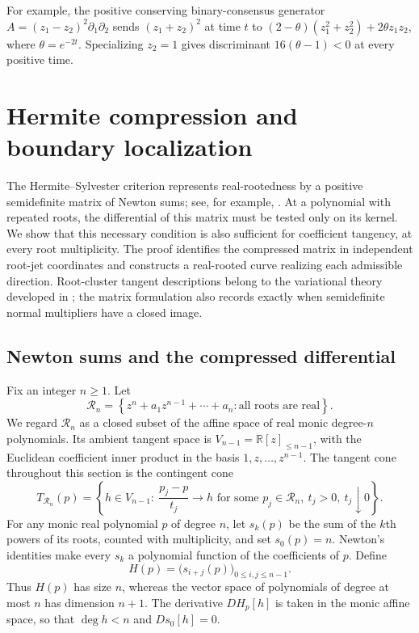 \documentclass[reqno]{amsart}
\theoremstyle{definition}
\theoremstyle{remark}
\newcommand{\R}{\mathbb R}
\begin{document}
For example, the positive conserving binary-consensus generator
\(A=(z_1-z_2)^2\partial_1\partial_2\) sends \((z_1+z_2)^2\) at time \(t\) to
\((2-\theta)(z_1^2+z_2^2)+2\theta z_1z_2\), where \(\theta=e^{-2t}\).
Specializing \(z_2=1\) gives discriminant \(16(\theta-1)<0\) at every
positive time.


\appendix
\section{Hermite compression and boundary localization}
\label{herm:section}

The Hermite--Sylvester criterion represents real-rootedness by a positive
semidefinite matrix of Newton sums; see, for example, \cite{Nathanson21}.
At a polynomial with repeated roots, the differential of this matrix must
be tested only on its kernel.  We show that this necessary condition is
also sufficient for coefficient tangency, at every root multiplicity.
The proof identifies the compressed matrix in independent root-jet
coordinates and constructs a real-rooted curve realizing each admissible
direction.  Root-cluster tangent descriptions belong to the variational
theory developed in \cite{BurkeOverton01,BurkeEaton12}; the matrix
formulation also records exactly when semidefinite normal multipliers
have a closed image.

\subsection{Newton sums and the compressed differential}

Fix an integer $n\geq1$.  Let
\[
 \mathcal R_n=
 \left\{z^n+a_1z^{n-1}+\cdots+a_n:
                  \text{all roots are real}\right\}.
\]
We regard $\mathcal R_n$ as a closed subset of the affine space of real
monic degree-$n$ polynomials.  Its ambient tangent space is
$V_{n-1}=\R[z]_{\leq n-1}$, with the Euclidean coefficient inner product
in the basis $1,z,\ldots,z^{n-1}$.  The tangent cone throughout this section
is the contingent cone
\begin{equation}
 T_{\mathcal R_n}(p)=
 \left\{h\in V_{n-1}:\ 
   \frac{p_j-p}{t_j}\longrightarrow h
   \text{ for some }p_j\in\mathcal R_n,
   \ t_j>0,\ t_j\downarrow0\right\}.
 \label{herm:tangent-definition}
\end{equation}
For any monic real polynomial $p$ of degree $n$, let $s_k(p)$ be the sum
of the $k$th powers of its roots, counted with multiplicity, and set
$s_0(p)=n$.  Newton's identities make every $s_k$ a polynomial function
of the coefficients of $p$.  Define
\begin{equation}
 H(p)=\bigl(s_{i+j}(p)\bigr)_{0\leq i,j\leq n-1}.
 \label{herm:matrix}
\end{equation}
Thus $H(p)$ has size $n$, whereas the vector space of polynomials of
degree at most $n$ has dimension $n+1$.  The derivative $DH_p[h]$ is
taken in the monic affine space, so that $\deg h<n$ and $Ds_0[h]=0$.
\end{document}
